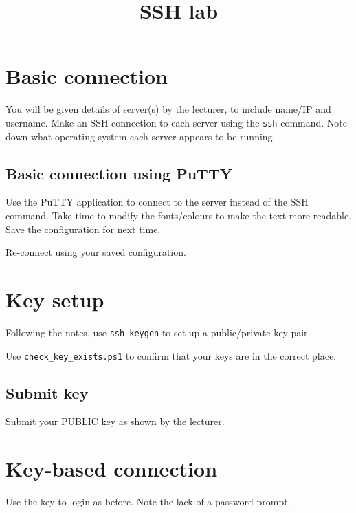 \documentclass{pgnotes}
\title{SSH lab}
\begin{document}
\maketitle

\section{Basic connection}

You will be given details of server(s) by the lecturer, to include name/IP and username.
Make an SSH connection to each server using the \texttt{ssh} command.
Note down what operating system each server appears to be running. 

\subsection{Basic connection using PuTTY}

Use the PuTTY application to connect to the server instead of the SSH command.
Take time to modify the fonts/colours to make the text more readable.
Save the configuration for next time.

Re-connect using your saved configuration.

\section{Key setup}

Following the notes, use \texttt{ssh-keygen} to set up a public/private key pair.

Use \texttt{check\_key\_exists.ps1} to confirm that your keys are in the correct place.

\subsection{Submit key}

Submit your PUBLIC key as shown by the lecturer.

\section{Key-based connection}

Use the key to login as before.
Note the lack of a password prompt.
\end{document}
